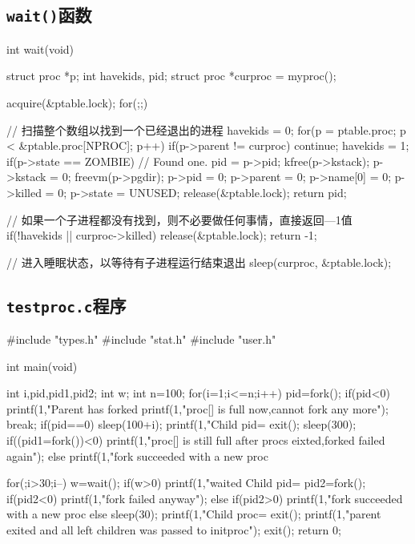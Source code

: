 \documentclass{swfuthesism}
\begin{document}
\subsection{\texttt{wait()}函数}
\label{sec:wait}

\begin{ccode}
int
wait(void)
{
  struct proc *p;
  int havekids, pid;
  struct proc *curproc = myproc();
  
  acquire(&ptable.lock);
  for(;;){
    // 扫描整个数组以找到一个已经退出的进程
    havekids = 0;
    for(p = ptable.proc; p < &ptable.proc[NPROC]; p++){
      if(p->parent != curproc)
        continue;
      havekids = 1;
      if(p->state == ZOMBIE){
        // Found one.
        pid = p->pid;
        kfree(p->kstack);
        p->kstack = 0;
        freevm(p->pgdir);
        p->pid = 0;
        p->parent = 0;
        p->name[0] = 0;
        p->killed = 0;
        p->state = UNUSED;
        release(&ptable.lock);
        return pid;
      }
    }

    // 如果一个子进程都没有找到，则不必要做任何事情，直接返回—1值
    if(!havekids || curproc->killed){
      release(&ptable.lock);
      return -1;
    }

    // 进入睡眠状态，以等待有子进程运行结束退出
    sleep(curproc, &ptable.lock);  
  }
}
\end{ccode}

\subsection{\texttt{testproc.c}程序}
\label{sec:testproc.c}
\begin{ccode}
#include "types.h"
#include "stat.h"
#include "user.h"

int main(void)
{
  int i,pid,pid1,pid2;
  int w;
  int n=100;
  for(i=1;i<=n;i++)
  {
    pid=fork();
    if(pid<0)
    {
      printf(1,"Parent has forked %
      printf(1,"proc[] is full now,cannot fork any more\n\n");
      break;
    }
    if(pid==0)
    {
      sleep(100+i);
      printf(1,"Child pid=%
      exit();
    }
  }
  sleep(300);
  if((pid1=fork())<0)
    printf(1,"proc[] is still full after procs eixted,forked failed again\n");
  else
    printf(1,"fork succeeded with a new proc %
  
  for(;i>30;i--)
  {
    w=wait();
    if(w>0)
      printf(1,"waited Child pid=%
  }
  pid2=fork();
  if(pid2<0)
    printf(1,"fork failed anyway\n");
  else if(pid2>0)
    printf(1,"fork succeeded with a new proc %
  else
  {
    sleep(30);
    printf(1,"Child proc=%
    exit();
  }
  printf(1,"parent exited and all left children was passed to initproc\n");
  exit();
  return 0;
}
\end{ccode}
\end{document}
